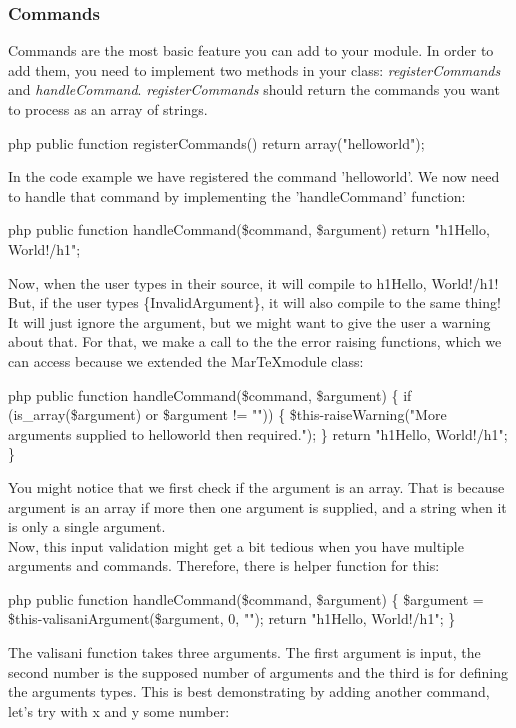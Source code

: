 \subsubsection{Commands}
Commands are the most basic feature you can add to your module. In order to add them, you need to implement two methods in your class: \textit{registerCommands} and \textit{handleCommand}.
\textit{registerCommands} should return the commands you want to process as an array of strings.
\begin{code}{php}
public function registerCommands() {
  return array("helloworld");
}
\end{code}
In the code example we have registered the command 'helloworld'. We now need to handle that command by implementing the 'handleCommand' function:
\begin{code}{php}
public function handleCommand(\$command, \$argument) {
  return "\<h1\>Hello, World!\</h1\>";
}
\end{code}
Now, when the user types \backslashhelloworld in their source, it will compile to \<h1\>Hello, World!\</h1\>! But, if the user types \backslashhelloworld\{InvalidArgument\}, it will also
compile to the same thing! It will just ignore the argument, but we might want to give the user a warning about that. For that, we make a call to the the error raising functions, which we can access because we extended the MarTeXmodule class:
\begin{code}{php}
public function handleCommand(\$command, \$argument) \{
  if (is_array(\$argument) or \$argument != "")) \{
    \$this-\>raiseWarning("More arguments supplied to helloworld then required.");
  \}
  return "\<h1\>Hello, World!\</h1\>";
\}
\end{code}
You might notice that we first check if the argument is an array. That is because argument is an array if more then one argument is supplied, and a string when it is only a single argument. \\
Now, this input validation might get a bit tedious when you have multiple arguments and commands. Therefore, there is helper function for this:
\begin{code}{php}
public function handleCommand(\$command, \$argument) \{
  \$argument = \$this-\>valisaniArgument(\$argument, 0, "");
  return "\<h1\>Hello, World!\</h1\>";
\}
\end{code}
The valisani function takes three arguments. The first argument is input, the second number is the supposed number of arguments and the third is for defining the arguments types. This is best demonstrating by adding another command, let's try  with x and y some number:

